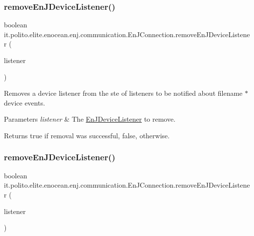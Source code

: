 \subsubsection{\texorpdfstring{remove\+En\+J\+Device\+Listener()}{removeEnJDeviceListener()}\hspace{0.1cm}{\footnotesize\ttfamily [1/2]}}
{\footnotesize\ttfamily boolean it.\+polito.\+elite.\+enocean.\+enj.\+communication.\+En\+J\+Connection.\+remove\+En\+J\+Device\+Listener (\begin{DoxyParamCaption}\item[{\hyperlink{interfaceit_1_1polito_1_1elite_1_1enocean_1_1enj_1_1communication_1_1_en_j_device_listener}{En\+J\+Device\+Listener}}]{listener }\end{DoxyParamCaption})}

Removes a device listener from the ste of listeners to be notified about filename $\ast$ device events.


\begin{DoxyParams}{Parameters}
{\em listener} & The \hyperlink{interfaceit_1_1polito_1_1elite_1_1enocean_1_1enj_1_1communication_1_1_en_j_device_listener}{En\+J\+Device\+Listener} to remove. \\
\hline
\end{DoxyParams}
\begin{DoxyReturn}{Returns}
true if removal was successful, false, otherwise. 
\end{DoxyReturn}
\hypertarget{classit_1_1polito_1_1elite_1_1enocean_1_1enj_1_1communication_1_1_en_j_connection_a52a60ea9eea1b5e6992e553ccc436dc5}{}\label{classit_1_1polito_1_1elite_1_1enocean_1_1enj_1_1communication_1_1_en_j_connection_a52a60ea9eea1b5e6992e553ccc436dc5} 
\subsubsection{\texorpdfstring{remove\+En\+J\+Device\+Listener()}{removeEnJDeviceListener()}\hspace{0.1cm}{\footnotesize\ttfamily [2/2]}}
{\footnotesize\ttfamily boolean it.\+polito.\+elite.\+enocean.\+enj.\+communication.\+En\+J\+Connection.\+remove\+En\+J\+Device\+Listener (\begin{DoxyParamCaption}\item[{\hyperlink{interfaceit_1_1polito_1_1elite_1_1enocean_1_1enj_1_1communication_1_1_en_j_teach_in_listener}{En\+J\+Teach\+In\+Listener}}]{listener }\end{DoxyParamCaption})}

